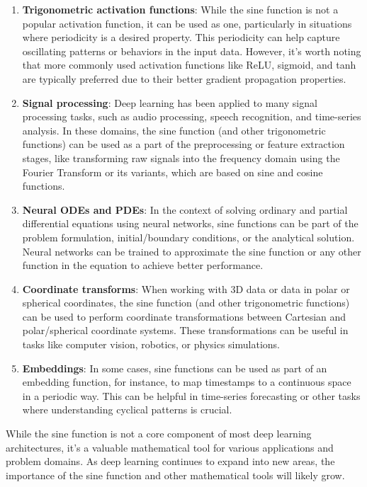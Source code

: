 \documentclass[
]{article}
\begin{document}
\begin{enumerate}
\def\labelenumi{\arabic{enumi}.}
\item
  \textbf{Trigonometric activation functions}: While the sine function
  is not a popular activation function, it can be used as one,
  particularly in situations where periodicity is a desired property.
  This periodicity can help capture oscillating patterns or behaviors in
  the input data. However, it's worth noting that more commonly used
  activation functions like ReLU, sigmoid, and tanh are typically
  preferred due to their better gradient propagation properties.
\item
  \textbf{Signal processing}: Deep learning has been applied to many
  signal processing tasks, such as audio processing, speech recognition,
  and time-series analysis. In these domains, the sine function (and
  other trigonometric functions) can be used as a part of the
  preprocessing or feature extraction stages, like transforming raw
  signals into the frequency domain using the Fourier Transform or its
  variants, which are based on sine and cosine functions.
\item
  \textbf{Neural ODEs and PDEs}: In the context of solving ordinary and
  partial differential equations using neural networks, sine functions
  can be part of the problem formulation, initial/boundary conditions,
  or the analytical solution. Neural networks can be trained to
  approximate the sine function or any other function in the equation to
  achieve better performance.
\item
  \textbf{Coordinate transforms}: When working with 3D data or data in
  polar or spherical coordinates, the sine function (and other
  trigonometric functions) can be used to perform coordinate
  transformations between Cartesian and polar/spherical coordinate
  systems. These transformations can be useful in tasks like computer
  vision, robotics, or physics simulations.
\item
  \textbf{Embeddings}: In some cases, sine functions can be used as part
  of an embedding function, for instance, to map timestamps to a
  continuous space in a periodic way. This can be helpful in time-series
  forecasting or other tasks where understanding cyclical patterns is
  crucial.
\end{enumerate}

While the sine function is not a core component of most deep learning
architectures, it's a valuable mathematical tool for various
applications and problem domains. As deep learning continues to expand
into new areas, the importance of the sine function and other
mathematical tools will likely grow.
\end{document}
